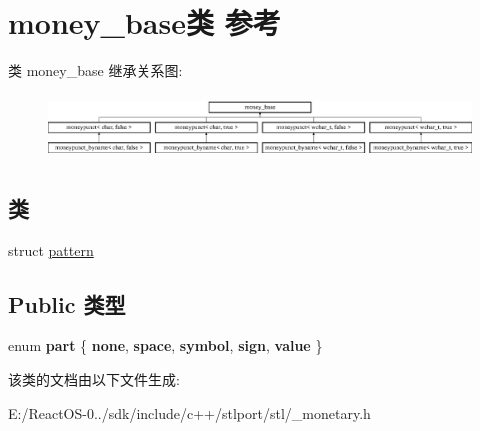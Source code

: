 \hypertarget{classmoney__base}{}\section{money\+\_\+base类 参考}
\label{classmoney__base}
类 money\+\_\+base 继承关系图\+:\begin{figure}[H]
\begin{center}
\leavevmode
\includegraphics[height=1.721312cm]{classmoney__base}
\end{center}
\end{figure}
\subsection*{类}
\begin{DoxyCompactItemize}
\item 
struct \hyperlink{structmoney__base_1_1pattern}{pattern}
\end{DoxyCompactItemize}
\subsection*{Public 类型}
\begin{DoxyCompactItemize}
\item 
\mbox{\label{classmoney__base_a9cee1173b25fe5d24aeff0c3bd18508a}} 
enum {\bfseries part} \{ \newline
{\bfseries none}, 
{\bfseries space}, 
{\bfseries symbol}, 
{\bfseries sign}, 
\newline
{\bfseries value}
 \}
\end{DoxyCompactItemize}


该类的文档由以下文件生成\+:\begin{DoxyCompactItemize}
\item 
E\+:/\+React\+O\+S-\/0../sdk/include/c++/stlport/stl/\+\_\+monetary.\+h\end{DoxyCompactItemize}
